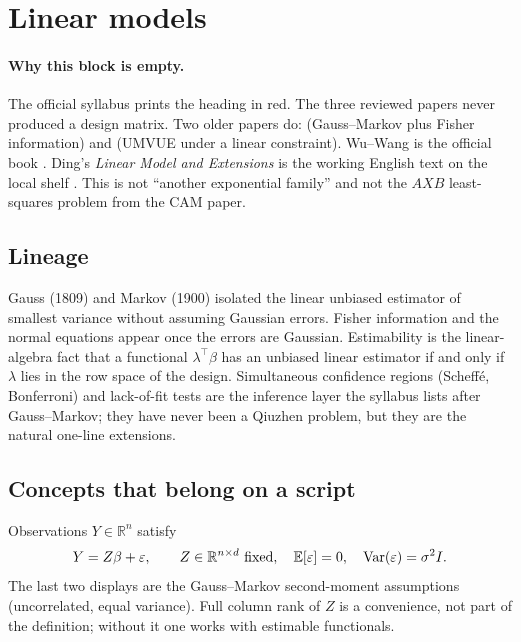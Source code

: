\section{Linear models}
\label{sec:lm}

\paragraph{Why this block is empty.}
The official syllabus prints the heading in red. The three reviewed papers never produced a design matrix. Two older papers do:  (Gauss--Markov plus Fisher information) and  (UMVUE under a linear constraint). Wu--Wang is the official book \cite{wuwang24}. Ding's \emph{Linear Model and Extensions} is the working English text on the local shelf \cite{ding25lm}. This is not ``another exponential family'' and not the \(AXB\) least-squares problem from the CAM paper.

\subsection{Lineage}

Gauss (1809) and Markov (1900) isolated the linear unbiased estimator of smallest variance without assuming Gaussian errors. Fisher information and the normal equations appear once the errors are Gaussian. Estimability is the linear-algebra fact that a functional \(\lambda^{\top}\beta\) has an unbiased linear estimator if and only if \(\lambda\) lies in the row space of the design. Simultaneous confidence regions (Scheff\'e, Bonferroni) and lack-of-fit tests are the inference layer the syllabus lists after Gauss--Markov; they have never been a Qiuzhen problem, but they are the natural one-line extensions.

\subsection{Concepts that belong on a script}

\begin{definition}
\label{def:lm}
Observations \(Y\in\mathbb{R}^{n}\) satisfy
\[
Y=Z\beta+\varepsilon,
\qquad
Z\in\mathbb{R}^{n\times d}\text{ fixed},
\quad
\mathbb{E}[\varepsilon]=0,
\quad
\Var(\varepsilon)=\sigma^{2}I.
\]
The last two displays are the Gauss--Markov second-moment assumptions (uncorrelated, equal variance). Full column rank of \(Z\) is a convenience, not part of the definition; without it one works with estimable functionals.
\end{definition}

